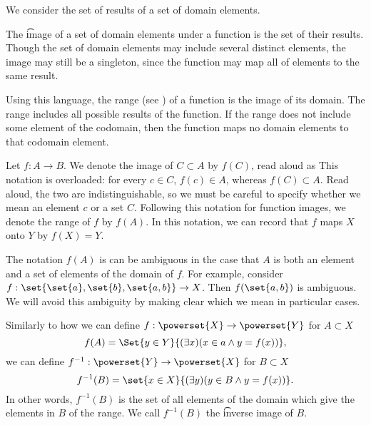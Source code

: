 

We consider the set of results of a set of domain elements.


The \t{image} of a set of domain elements under a function is the set of their results.
Though the set of domain elements may include several distinct elements, the image may still be a singleton, since the function may map all of elements to the same result.

Using this language, the range (see ) of a function is the image of its domain.
The range includes all possible results of the function.
If the range does not include some element of the codomain, then the function maps no domain elements to that codomain element.


Let $f: A \to B$.
We denote the image of $C \subset A$ by $f(C)$, read aloud as 
This notation is overloaded: for every $c \in C$, $f(c) \in A$, whereas $f(C) \subset A$.
Read aloud, the two are indistinguishable, so we must be careful to specify whether we mean an element $c$ or a set $C$.
Following this notation for function images, we denote the range of $f$ by $f(A)$.
In this notation, we can record that $f$ maps $X$ onto $Y$ by $f(X) = Y$.


The notation $f(A)$ is can be ambiguous in the case that $A$ is both an element and a set of elements of the domain of $f$.
For example, consider $f: \set{\set{a}, \set{b}, \set{a, b}} \to X$.
Then $f(\set{a, b})$ is ambiguous.
We will avoid this ambiguity by making clear which we mean in particular cases.



Similarly to how we can define $f: \powerset{X} \to \powerset{Y}$ for $A \subset X$
\[
  f(A) = \Set{y \in Y}{(\exists x)(x \in a \land y = f(x))},
\]
we can define $f^{-1}: \powerset{Y} \to \powerset{X}$ for $B \subset X$
\[
  f^{-1}(B) = \set{x \in X}{(\exists y)(y \in B \land y = f(x))}.
\]
In other words, $f^{-1}(B)$ is the set of all elements of the domain which give the elements in $B$ of the range.
We call $f^{-1}(B)$ the \t{inverse image} of $B$.
